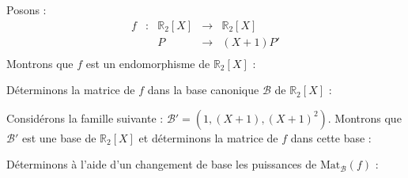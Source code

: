 \documentclass[french,11pt,twoside]{VcCours}
\begin{document}
\begin{Exemple} Posons :
$$ \begin{array}{ccccl}
f & : & \mathbb{R}_2[X] & \rightarrow & \mathbb{R}_2[X] \\
& & P & \rightarrow & (X+1)P' \\
\end{array} $$
Montrons que $f$ est un endomorphisme de $ \mathbb{R}_2[X]$ :

\vspace{3cm}


Déterminons la matrice de $f$ dans la base canonique $\mathcal{B}$ de $\mathbb{R}_2[X]$ :

\vspace{5cm}

Considérons la famille suivante : $\mathcal{B}'= (1, (X+1),(X+1)^2)$. Montrons que $\mathcal{B}'$ est une base de $\mathbb{R}_2[X]$ et déterminons la matrice de $f$ dans cette base :

\vspace*{6.5cm}

Déterminons à l'aide d'un changement de base les puissances de $\textrm{Mat}_{\mathcal{B}}(f)$ :



\end{Exemple}
\end{document}
